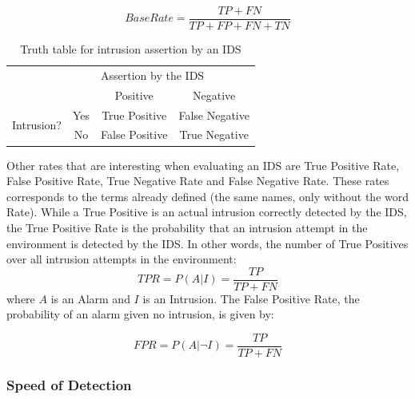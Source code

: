 \documentclass[12pt]{article}
\theoremstyle{definition}
\begin{document}
		\begin{equation}
			\label{base-rate-eqn}
			Base Rate = \frac{TP + FN}{TP + FP + FN + TN}
		\end{equation}
		
		\begin{table}[]
			\centering
			\caption{Truth table for intrusion assertion by an IDS}
			\label{table:ids-tt}
			\begin{tabular}{|c|c|c|c|}
				\hline
				\multicolumn{2}{|c|}{\multirow{2}{*}{\textbf{}}} & \multicolumn{2}{l|}{Assertion by the IDS} \\ \cline{3-4} 
				\multicolumn{2}{|c|}{}                           & Positive            & Negative            \\ \hline
				\multirow{2}{*}{Intrusion?}         & Yes        & True Positive       & False Negative      \\ \cline{2-4} 
				& No         & False Positive      & True Negative       \\ \hline
			\end{tabular}
		\end{table}
	
		Other rates that are interesting when evaluating an IDS are True Positive Rate, False Positive Rate, True Negative Rate and False Negative Rate. These rates corresponds to the terms already defined (the same names, only without the word Rate). While a True Positive is an actual intrusion correctly detected by the IDS, the True Positive Rate is the probability that an intrusion attempt in the environment is detected by the IDS. In other words, the number of True Positives over all intrusion attempts in the environment:
		\begin{equation}
		TPR = P(A | I) = \frac{TP}{TP + FN}
		\end{equation}
		where $ A $ is an Alarm and $ I $ is an Intrusion. The False Positive Rate, the probability of an alarm given no intrusion, is given by:
		
		\begin{equation}
			FPR = P(A | \neg I) = \frac{TP}{TP + FN}
		\end{equation}
		
		\subsubsection{Speed of Detection}
		

	\cleardoublepage
\end{document}
